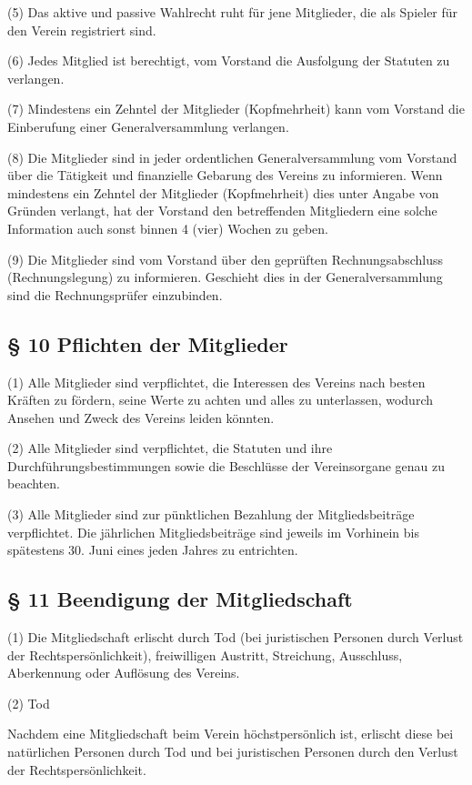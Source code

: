 \documentclass[11pt,a4paper]{article}
\begin{document}
(5)
Das aktive und passive Wahlrecht ruht für jene Mitglieder, die als Spieler für den Verein registriert sind.

(6)
Jedes Mitglied ist berechtigt, vom Vorstand die Ausfolgung der Statuten zu verlangen.

(7)
Mindestens ein Zehntel der Mitglieder (Kopfmehrheit) kann vom Vorstand die Einberufung einer Generalversammlung verlangen.

(8)
Die Mitglieder sind in jeder ordentlichen Generalversammlung vom Vorstand über die Tätigkeit und finanzielle Gebarung des Vereins zu informieren.
Wenn mindestens ein Zehntel der Mitglieder (Kopfmehrheit) dies unter Angabe von Gründen verlangt, hat der Vorstand den betreffenden Mitgliedern eine solche Information auch sonst binnen 4 (vier) Wochen zu geben.

(9)
Die Mitglieder sind vom Vorstand über den geprüften Rechnungsabschluss (Rechnungslegung) zu informieren.
Geschieht dies in der Generalversammlung sind die Rechnungsprüfer einzubinden.

\subsection{§ 10
Pflichten der Mitglieder}

(1)
Alle Mitglieder sind verpflichtet, die Interessen des Vereins nach besten Kräften zu fördern, seine Werte zu achten und alles zu unterlassen, wodurch Ansehen und Zweck des Vereins leiden könnten.

(2)
Alle Mitglieder sind verpflichtet, die Statuten und ihre Durchführungsbestimmungen sowie die Beschlüsse der Vereinsorgane genau zu beachten.

(3)
Alle Mitglieder sind zur pünktlichen Bezahlung der Mitgliedsbeiträge verpflichtet.
Die jährlichen Mitgliedsbeiträge sind jeweils im Vorhinein bis spätestens 30. Juni eines jeden Jahres zu entrichten.

\subsection{§ 11
Beendigung der Mitgliedschaft}

(1)
Die Mitgliedschaft erlischt durch Tod (bei juristischen Personen durch Verlust der Rechtspersönlichkeit), freiwilligen Austritt, Streichung, Ausschluss, Aberkennung oder Auflösung des Vereins.

(2)
Tod

Nachdem eine Mitgliedschaft beim Verein höchstpersönlich ist, erlischt diese bei natürlichen Personen durch Tod und bei juristischen Personen durch den Verlust der Rechtspersönlichkeit.
\end{document}
